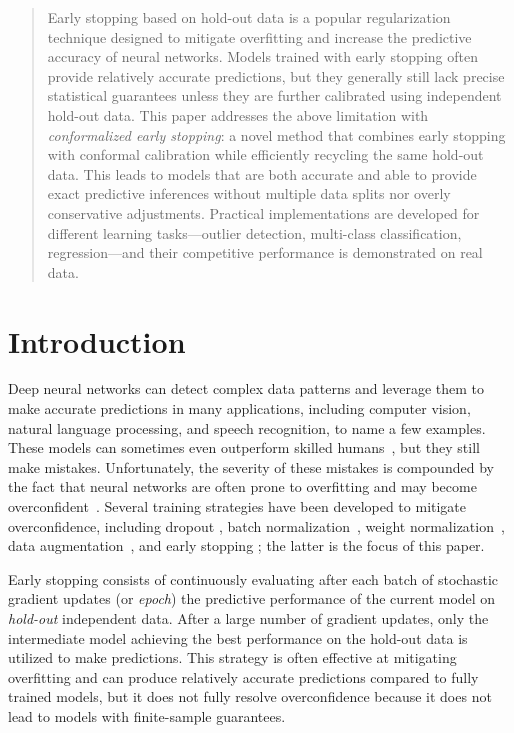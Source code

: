 \begin{abstract}
Early stopping based on hold-out data is a popular regularization technique designed to mitigate overfitting and increase the predictive accuracy of neural networks. Models trained with early stopping often provide relatively accurate predictions, but they generally still lack precise statistical guarantees unless they are further calibrated using independent hold-out data. This paper addresses the above limitation with {\em conformalized early stopping}: a novel method that combines early stopping with conformal calibration while efficiently recycling the same hold-out data. This leads to models that are both accurate and able to provide exact predictive inferences without multiple data splits nor overly conservative adjustments. Practical implementations are developed for different learning tasks---outlier detection, multi-class classification, regression---and their competitive performance is demonstrated on real data.
\end{abstract}


\section{Introduction}

Deep neural networks can detect complex data patterns and leverage them to make accurate predictions in many applications, including computer vision, natural language processing, and speech recognition, to name a few examples.
These models can sometimes even outperform skilled humans~\cite{silver2016mastering}, but they still make mistakes.
Unfortunately, the severity of these mistakes is compounded by the fact that neural networks are often prone to overfitting and may become overconfident~\cite{guo2017calibration}.
Several training strategies have been developed to mitigate overconfidence, including dropout \citep{srivastava2014dropout}, batch normalization~\cite{ioffe2015batch}, weight normalization~\cite{salimans2016weight}, data augmentation~\cite{shorten2019survey}, and early stopping \citep{PRECHELT1997}; the latter is the focus of this paper.

Early stopping consists of continuously evaluating after each batch of stochastic gradient updates (or {\em epoch}) the predictive performance of the current model on {\em hold-out} independent data.
After a large number of gradient updates, only the intermediate model achieving the best performance on the hold-out data is utilized to make predictions.
This strategy is often effective at mitigating overfitting and can produce relatively accurate predictions compared to fully trained models, but it does not fully resolve overconfidence because it does not lead to models with finite-sample guarantees.

